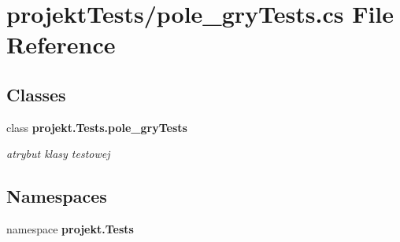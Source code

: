 \section{projekt\+Tests/pole\+\_\+gry\+Tests.cs File Reference}
\label{pole__gryTests_8cs}
\subsection*{Classes}
\begin{DoxyCompactItemize}
\item 
class \textbf{ projekt.\+Tests.\+pole\+\_\+gry\+Tests}
\begin{DoxyCompactList}\small\item\em atrybut klasy testowej \end{DoxyCompactList}\end{DoxyCompactItemize}
\subsection*{Namespaces}
\begin{DoxyCompactItemize}
\item 
namespace \textbf{ projekt.\+Tests}
\end{DoxyCompactItemize}
